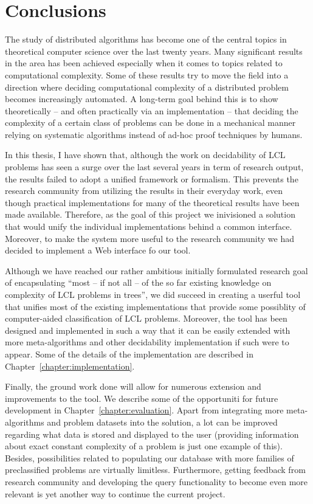 \chapter{Conclusions}
\label{chapter:conclusions}

The study of distributed algorithms has become
one of the central topics in theoretical computer science
over the last twenty years. Many significant results in the area
has been achieved especially when it comes to topics related
to computational complexity. Some of these results
try to move the field into a direction where deciding
computational complexity of a distributed problem becomes
increasingly automated. A long-term goal behind this is
to show theoretically -- and often practically via an
implementation -- that deciding the complexity of a certain class
of problems can be done in a mechanical manner relying
on systematic algorithms instead of ad-hoc proof techniques
by humans.

In this thesis, I have shown that, although the work on
decidability of LCL problems has seen a surge over the last
several years in term of research output, the results
failed to adopt a unified framework or formalism. This
prevents the research community from utilizing the
results in their everyday work, even though practical
implementations for many of the theoretical results have been
made available. Therefore, as the goal of this project we
inivisioned a solution that would unify the individual
implementations behind a common interface. Moreover, to make
the system more useful to the research community we had decided
to implement a Web interface fo our tool.

Although we have reached our rather ambitious initially formulated
research goal of encapsulating ``most -- if not
all -- of
the so far existing knowledge on complexity of LCL
problems in trees'', we did succeed in creating a userful
tool that unifies most of the existing implementations that
provide some possiblity of computer-aided classification of LCL
problems. Moreover, the tool has been designed and implemented in
such a way that it can be easily extended with more meta-algorithms
and other decidability implementation if such were to appear.
Some of the details of the implementation are described
in Chapter~\ref{chapter:implementation}.

Finally, the ground work done will allow for numerous
extension and improvements to the tool. We describe
some of the opportuniti for future development in
Chapter~\ref{chapter:evaluation}. Apart from
integrating more meta-algorithms and problem datasets into the
solution, a lot can be improved regarding what data
is stored and displayed to the user
(providing information about exact constant complexity of
a problem is just one example of this). Besides,
possibilities related to populating our database with more
families of preclassified problems are virtually limitless.
Furthermore, getting feedback from research community and
developing the query functionality to become even more
relevant is yet another way to continue the current
project.
